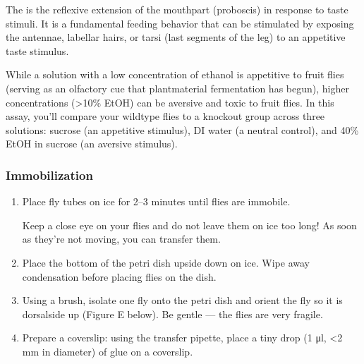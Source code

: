 \documentclass[letterpaper,10pt,english]{jupyterBook}
\begin{document}
\sphinxAtStartPar
The  is the reflexive extension of the mouthpart (proboscis) in response to taste stimuli. It is a fundamental feeding behavior that can be stimulated by exposing the antennae, labellar hairs, or tarsi (last segments of the leg) to an appetitive taste stimulus.

\sphinxAtStartPar
While a solution with a low concentration of ethanol is appetitive to fruit flies (serving as an olfactory cue that plant\sphinxhyphen{}material fermentation has begun), higher concentrations (>10\% EtOH) can be aversive and toxic to fruit flies. In this assay, you’ll compare your wildtype flies to a knockout group across three solutions: sucrose (an appetitive stimulus), DI water (a neutral control), and 40\% EtOH in sucrose (an aversive stimulus).


\subsubsection{Immobilization}
\label{\detokenize{Drosophila/Day1:immobilization}}\begin{enumerate}
%
\item {} 
\sphinxAtStartPar
Place fly tubes on ice for 2–3 minutes until flies are immobile.

\sphinxAtStartPar
{} Keep a close eye on your flies and do not leave them on ice too long! As soon as they’re not moving, you can transfer them.

\item {} 
\sphinxAtStartPar
Place the bottom of the petri dish upside down on ice. Wipe away condensation before placing flies on the dish.

\item {} 
\sphinxAtStartPar
Using a brush,  isolate one fly onto the petri dish and  orient the fly so it is dorsal\sphinxhyphen{}side up (Figure E below). Be gentle — the flies are very fragile.

\item {} 
\sphinxAtStartPar
Prepare a coverslip: using the transfer pipette, place a tiny drop (1 μl, <2 mm in diameter) of glue on a coverslip.

\end{enumerate}
\end{document}
